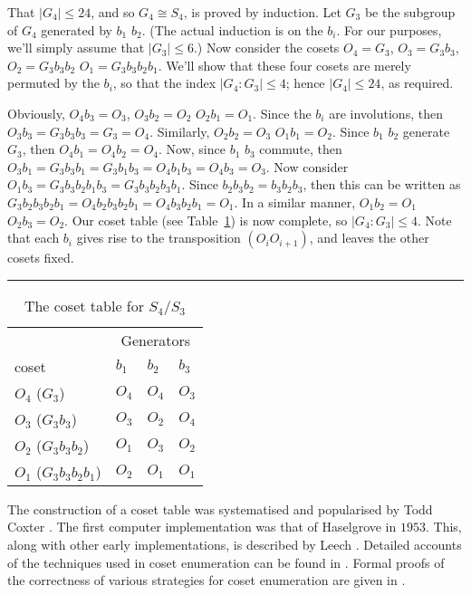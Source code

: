 That $|G_4| \le 24$, and so $G_4 \cong S_4$, is proved by induction.
Let $G_3$ be the subgroup of $G_4$ generated by $b_1$ \amp $b_2$.
(The actual induction is on the $b_i$.
For our purposes, we'll simply assume that $|G_3| \le 6$.)
Now consider the cosets $O_4=G_3$, $O_3=G_3b_3$, $O_2=G_3b_3b_2$ \amp 
  $O_1=G_3b_3b_2b_1$.
We'll show that these four cosets are merely permuted by the $b_i$, so
  that the index $|G_4 : G_3| \le 4$; hence $|G_4| \le 24$, as required.

Obviously, $O_4b_3=O_3$, $O_3b_2=O_2$ \amp $O_2b_1=O_1$.
Since the $b_i$ are involutions, then $O_3b_3=G_3b_3b_3=G_3=O_4$.
Similarly, $O_2b_2=O_3$ \amp $O_1b_1=O_2$.
Since $b_1$ \amp $b_2$ generate $G_3$, then $O_4b_1=O_4b_2=O_4$.
Now, since $b_1$ \amp $b_3$ commute, then 
  $O_3b_1=G_3b_3b_1=G_3b_1b_3=O_4b_1b_3=O_4b_3=O_3$.
Now consider $O_1b_3=G_3b_3b_2b_1b_3=G_3b_3b_2b_3b_1$.
Since $b_2b_3b_2=b_3b_2b_3$, then this can be written as 
  $G_3b_2b_3b_2b_1=O_4b_2b_3b_2b_1=O_4b_3b_2b_1=O_1$.
In a similar manner, $O_1b_2=O_1$ \amp $O_2b_3=O_2$.
Our coset table (see Table~\ref{tab:dic}) is now complete, so 
  $|G_4 : G_3| \le 4$.
Note that each $b_i$ gives rise to the transposition $(O_iO_{i+1})$, and
  leaves the other cosets fixed.

\begin{table}
\hrule
\caption{The coset table for $S_4/S_3$}
\label{tab:dic}
\smallskip
\renewcommand{\arraystretch}{0.875}
\begin{tabular*}{\textwidth}{@{\extracolsep{\fill}}llll} 
\hline\hline
 & \multicolumn{3}{c}{Generators} \\
\cline{2-4}
coset                   & $b_1$ & $b_2$ & $b_3$ \\ 
\hline
 $O_4$ ($G_3$)          & $O_4$ & $O_4$ & $O_3$ \\
 $O_3$ ($G_3b_3$)       & $O_3$ & $O_2$ & $O_4$ \\
 $O_2$ ($G_3b_3b_2$)    & $O_1$ & $O_3$ & $O_2$ \\
 $O_1$ ($G_3b_3b_2b_1$) & $O_2$ & $O_1$ & $O_1$ \\
\hline\hline
\end{tabular*}
\end{table}

The construction of a coset table was systematised and popularised by Todd
  \amp Coxter \cite{TC}.
The first computer implementation was that of Haselgrove in $1953$.
This, along with other early implementations, is described by Leech
  \cite{Lee3}.
Detailed accounts of the techniques used in coset enumeration can be found
  in \cite{CDHW,Hav,Lee,Neu,Sim}.
Formal proofs of the correctness of various strategies for coset
  enumeration are given in \cite{Men,Neu,Sim}.
